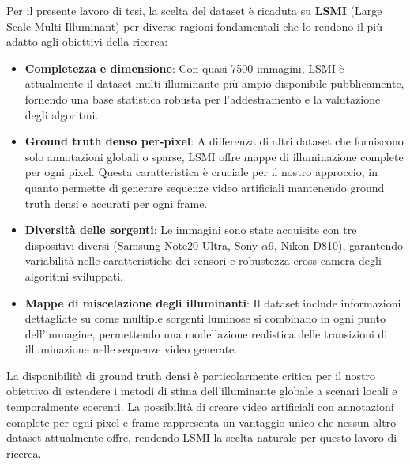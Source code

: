 Per il presente lavoro di tesi, la scelta del dataset è ricaduta su \textbf{LSMI} (Large Scale Multi-Illuminant) \cite{kim_large_2021} per diverse ragioni fondamentali che lo rendono il più adatto agli obiettivi della ricerca:

\begin{itemize}
\item \textbf{Completezza e dimensione}: Con quasi 7500 immagini, LSMI è attualmente il dataset multi-illuminante più ampio disponibile pubblicamente, fornendo una base statistica robusta per l'addestramento e la valutazione degli algoritmi.

\item \textbf{Ground truth denso per-pixel}: A differenza di altri dataset che forniscono solo annotazioni globali o sparse, LSMI offre mappe di illuminazione complete per ogni pixel. Questa caratteristica è cruciale per il nostro approccio, in quanto permette di generare sequenze video artificiali mantenendo ground truth densi e accurati per ogni frame.

\item \textbf{Diversità delle sorgenti}: Le immagini sono state acquisite con tre dispositivi diversi (Samsung Note20 Ultra, Sony $\alpha$9, Nikon D810), garantendo variabilità nelle caratteristiche dei sensori e robustezza cross-camera degli algoritmi sviluppati.

\item \textbf{Mappe di miscelazione degli illuminanti}: Il dataset include informazioni dettagliate su come multiple sorgenti luminose si combinano in ogni punto dell'immagine, permettendo una modellazione realistica delle transizioni di illuminazione nelle sequenze video generate.
\end{itemize}

La disponibilità di ground truth densi è particolarmente critica per il nostro obiettivo di estendere i metodi di stima dell'illuminante globale a scenari locali e temporalmente coerenti. La possibilità di creare video artificiali con annotazioni complete per ogni pixel e frame rappresenta un vantaggio unico che nessun altro dataset attualmente offre, rendendo LSMI la scelta naturale per questo lavoro di ricerca.

\clearpage
\thispagestyle{empty}
\begin{landscape}
\vspace*{\fill}
\begin{center}
\label{tab:algorithms}
\label{tab:datasets}
\end{center}
\vspace*{\fill}
\end{landscape}

